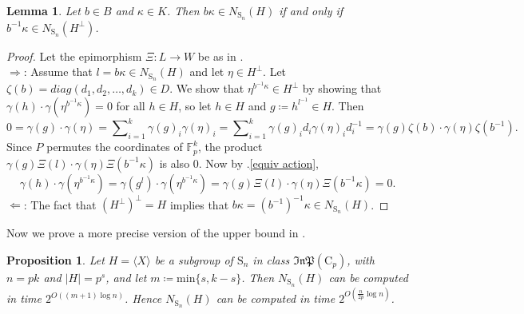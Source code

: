 \documentclass[11pt,a4paper]{article}
\newtheorem{lemma}[theorem]{Lemma}
\newtheorem{proposition}[theorem]{Proposition}
\theoremstyle{definition}
\theoremstyle{remark}
\newcommand{\InP}{\mathfrak{InP}}
\newcommand{\Sy}{\mathrm{S}}
\newcommand{\Cy}{\mathrm{C}}
\begin{document}
\begin{lemma}  \label{search in dual}
Let $b \in B$ and $\kappa \in K$.
Then $b\kappa \in N_{\Sy_n}(H)$ if and only if  $b^{-1} \kappa \in N_{\Sy_n}(H^{\bot})$.
\end{lemma}

\begin{proof}
Let the epimorphism $\Xi: L \rightarrow W$ be as in .\\
$\Rightarrow$: 
Assume that $l=b\kappa \in N_{\Sy_n}(H)$ and let $\eta \in H^{\bot}$.
Let $\zeta(b ) = diag(d_1, d_2, \ldots, d_k) \in D$. 
We show that $\eta^{b^{-1}  \kappa} \in H^{\bot}$ by showing that $\gamma(h) \cdot  \gamma(\eta^{b^{-1} \kappa}) = 0$ for all $h \in H$, so let $h \in H$ and $g \coloneqq h^{l^{-1}} \in H$. 
Then 
\[
 0 = \gamma(g) \cdot \gamma(\eta) = \sum\nolimits_{i=1}^{k} \gamma(g)_i \gamma(\eta)_i =  \sum\nolimits_{i=1}^{k} \gamma(g)_i d_i \gamma(\eta)_i d_i^{-1} = \gamma(g){\zeta(b)} \cdot \gamma(\eta){\zeta(b^{-1})}.   
\]
Since $P$ permutes the coordinates of $\mathds{F}_p^k$, the product
$\gamma(g){\Xi(l) } \cdot \gamma(\eta){\Xi(b^{-1} \kappa)}$ is also $0$. 
Now by {.\ref{equiv action},} 
\[ 
\gamma(h) \cdot  \gamma(\eta^{b^{-1} \kappa}) 
= \gamma(g^{l}) \cdot \gamma(\eta^{b^{-1} \kappa})
= \gamma(g){\Xi(l) } \cdot \gamma(\eta){\Xi(b^{-1} \kappa)}
= 0. 
\]
$\Leftarrow$: The fact that $(H^{\bot})^{\bot} = H$ implies that $b \kappa = (b^{-1})^{-1} \kappa \in N_{\Sy_n}(H)$. 
\end{proof}

Now we prove a more precise version of the upper bound in .

\begin{proposition} \label{limit depth by base size}
Let $H = \langle X \rangle$ be a subgroup of $\Sy_n$ in class $\InP(\Cy_p)$, with $n=pk$ and $|H| = p^s$, and let $m  \coloneqq  \mathrm{min}\{ s, k- s\}$. 
Then $N_{\Sy_n}(H)$ can be computed in time $2^{O((m+1) \log{n} )}$. 
Hence $N_{\Sy_n}(H)$ can be computed in time $2^{O(\frac{n}{2p} \log{n})}$.
\end{proposition}
\end{document}
